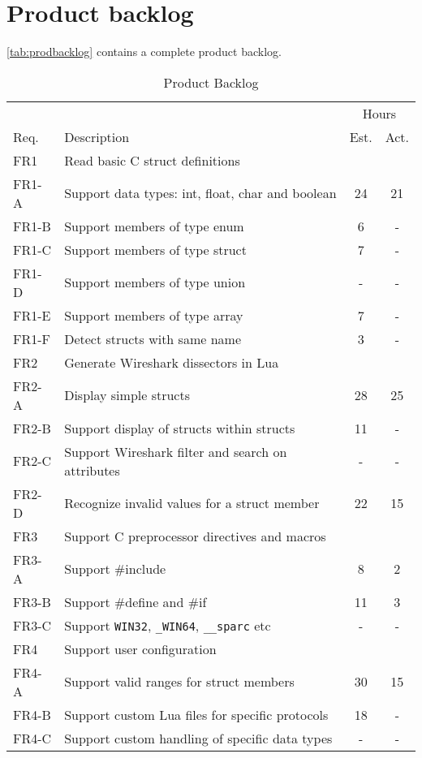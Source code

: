 \section{Product backlog}
\label{sec:prodbacklog}
\autoref{tab:prodbacklog} contains a complete product backlog.

\begin{table}[ht] \small \center
\caption{Product Backlog \label{tab:prodbacklog}}
\begin{tabularx}{\textwidth}{l X c c}
	\toprule
	& & \multicolumn{2}{c}{Hours} \\
	\cmidrule(r){3-4}
	Req. & Description & Est. & Act. \\
	\midrule
	FR1 & Read basic C struct definitions & & \\
	FR1-A & Support data types: int, float, char and boolean & 24 & 21 \\
	FR1-B & Support members of type enum & 6 & - \\
	FR1-C & Support members of type struct & 7 & - \\
	FR1-D & Support members of type union & - & - \\
	FR1-E & Support members of type array & 7 & - \\
	FR1-F & Detect structs with same name & 3 & - \\
	\addlinespace
	FR2 & Generate Wireshark dissectors in Lua & & \\
	FR2-A & Display simple structs & 28 & 25 \\
	FR2-B & Support display of structs within structs & 11 & - \\
	FR2-C & Support Wireshark filter and search on attributes & - & - \\
	FR2-D & Recognize invalid values for a struct member & 22 & 15 \\
	\addlinespace
	FR3 & Support C preprocessor directives and macros & & \\
	FR3-A & Support \#include & 8 & 2 \\
	FR3-B & Support \#define and \#if & 11 & 3 \\
	FR3-C & Support \verb+WIN32+, \verb+_WIN64+, \verb+__sparc+ etc & - & - \\
	\addlinespace
	FR4 & Support user configuration & & \\
	FR4-A & Support valid ranges for struct members & 30 & 15 \\
	FR4-B & Support custom Lua files for specific protocols & 18 & - \\
	FR4-C & Support custom handling of specific data types & - & - \\

\end{tabularx}
\end{table}
